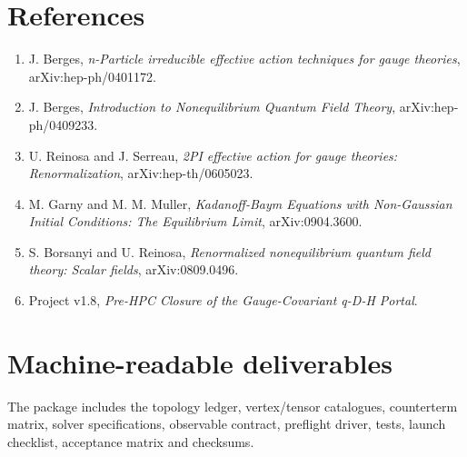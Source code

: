 \documentclass[
  10pt,
]{article}
\providecommand{\tightlist}{%
  \setlength{\itemsep}{0pt}\setlength{\parskip}{0pt}}
\begin{document}
\section{References}\label{references}

\begin{enumerate}
\def\labelenumi{\arabic{enumi}.}
\tightlist
\item
  J. Berges, \emph{n-Particle irreducible effective action techniques
  for gauge theories}, arXiv:hep-ph/0401172.
\item
  J. Berges, \emph{Introduction to Nonequilibrium Quantum Field Theory},
  arXiv:hep-ph/0409233.
\item
  U. Reinosa and J. Serreau, \emph{2PI effective action for gauge
  theories: Renormalization}, arXiv:hep-th/0605023.
\item
  M. Garny and M. M. Muller, \emph{Kadanoff-Baym Equations with
  Non-Gaussian Initial Conditions: The Equilibrium Limit},
  arXiv:0904.3600.
\item
  S. Borsanyi and U. Reinosa, \emph{Renormalized nonequilibrium quantum
  field theory: Scalar fields}, arXiv:0809.0496.
\item
  Project v1.8, \emph{Pre-HPC Closure of the Gauge-Covariant q-D-H
  Portal}.
\end{enumerate}

\section{Machine-readable
deliverables}\label{machine-readable-deliverables}

The package includes the topology ledger, vertex/tensor catalogues,
counterterm matrix, solver specifications, observable contract,
preflight driver, tests, launch checklist, acceptance matrix and
checksums.
\end{document}
